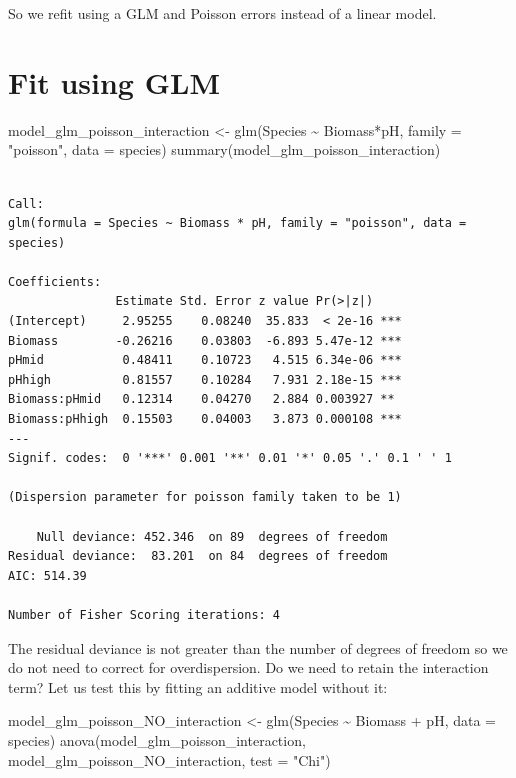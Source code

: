 \documentclass[
  letterpaper,
  DIV=11,
  numbers=noendperiod]{scrreprt}
\newenvironment{Shaded}{\begin{snugshade}}{\end{snugshade}}
\newcommand{\AttributeTok}[1]{\textcolor[rgb]{0.40,0.45,0.13}{#1}}
\newcommand{\FunctionTok}[1]{\textcolor[rgb]{0.28,0.35,0.67}{#1}}
\newcommand{\NormalTok}[1]{\textcolor[rgb]{0.00,0.23,0.31}{#1}}
\newcommand{\OtherTok}[1]{\textcolor[rgb]{0.00,0.23,0.31}{#1}}
\newcommand{\SpecialCharTok}[1]{\textcolor[rgb]{0.37,0.37,0.37}{#1}}
\newcommand{\StringTok}[1]{\textcolor[rgb]{0.13,0.47,0.30}{#1}}
\begin{document}
So we refit using a GLM and Poisson errors instead of a linear model.

\section{Fit using GLM}\label{fit-using-glm}

\begin{Shaded}
\begin{Highlighting}[]
\NormalTok{model\_glm\_poisson\_interaction }\OtherTok{\textless{}{-}} \FunctionTok{glm}\NormalTok{(Species }\SpecialCharTok{\textasciitilde{}}\NormalTok{ Biomass}\SpecialCharTok{*}\NormalTok{pH, }\AttributeTok{family =} \StringTok{"poisson"}\NormalTok{, }\AttributeTok{data =}\NormalTok{ species)}
\FunctionTok{summary}\NormalTok{(model\_glm\_poisson\_interaction)}
\end{Highlighting}
\end{Shaded}

\begin{verbatim}

Call:
glm(formula = Species ~ Biomass * pH, family = "poisson", data = species)

Coefficients:
               Estimate Std. Error z value Pr(>|z|)    
(Intercept)     2.95255    0.08240  35.833  < 2e-16 ***
Biomass        -0.26216    0.03803  -6.893 5.47e-12 ***
pHmid           0.48411    0.10723   4.515 6.34e-06 ***
pHhigh          0.81557    0.10284   7.931 2.18e-15 ***
Biomass:pHmid   0.12314    0.04270   2.884 0.003927 ** 
Biomass:pHhigh  0.15503    0.04003   3.873 0.000108 ***
---
Signif. codes:  0 '***' 0.001 '**' 0.01 '*' 0.05 '.' 0.1 ' ' 1

(Dispersion parameter for poisson family taken to be 1)

    Null deviance: 452.346  on 89  degrees of freedom
Residual deviance:  83.201  on 84  degrees of freedom
AIC: 514.39

Number of Fisher Scoring iterations: 4
\end{verbatim}

The residual deviance is not greater than the number of degrees of
freedom so we do not need to correct for overdispersion. Do we need to
retain the interaction term? Let us test this by fitting an additive
model without it:

\begin{Shaded}
\begin{Highlighting}[]
\NormalTok{model\_glm\_poisson\_NO\_interaction }\OtherTok{\textless{}{-}} \FunctionTok{glm}\NormalTok{(Species }\SpecialCharTok{\textasciitilde{}}\NormalTok{ Biomass }\SpecialCharTok{+}\NormalTok{ pH, }\AttributeTok{data =}\NormalTok{ species)}
\FunctionTok{anova}\NormalTok{(model\_glm\_poisson\_interaction, model\_glm\_poisson\_NO\_interaction, }\AttributeTok{test =} \StringTok{"Chi"}\NormalTok{)}
\end{Highlighting}
\end{Shaded}
\end{document}
